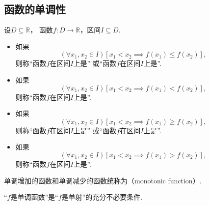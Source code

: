 \subsection{函数的单调性}
\begin{definition}\label{definition:函数的性质.单调性}
设\(D\subseteq\mathbb{R}\)，
函数\(f\colon D\to\mathbb{R}\)，区间\(I \subseteq D\).
\begin{itemize}
	\item 如果\[
		(\forall x_1,x_2\in I)
		[x_1 < x_2 \implies f(x_1) \leq f(x_2)],
	\]
	则称“函数\(f\)在区间\(I\)上是”
	或“函数\(f\)在区间\(I\)上是”.

	\item 如果\[
		(\forall x_1,x_2\in I)
		[x_1 < x_2 \implies f(x_1) < f(x_2)],
	\]
	则称“函数\(f\)在区间\(I\)上是”.

	\item 如果\[
		(\forall x_1,x_2\in I)
		[x_1 < x_2 \implies f(x_1) \geq f(x_2)],
	\]
	则称“函数\(f\)在区间\(I\)上是”
	或“函数\(f\)在区间\(I\)上是”.

	\item 如果\[
		(\forall x_1,x_2\in I)
		[x_1 < x_2 \implies f(x_1) > f(x_2)],
	\]
	则称“函数\(f\)在区间\(I\)上是”.
\end{itemize}

单调增加的函数和单调减少的函数统称为（monotonic function）.
\end{definition}

\begin{proposition}
“\(f\)是单调函数”是“\(f\)是单射”的充分不必要条件.
\end{proposition}

